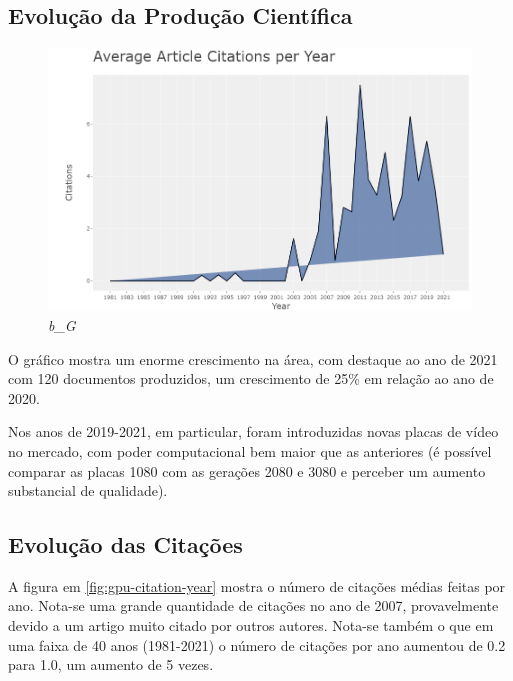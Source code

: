 \subsection{Evolução da Produção Científica}



\begin{figure}[ht]
    \centering
    \includegraphics[width=12cm]{experiments/gustavo-tomas/AnaliseBibliometrica/GPUs/Graficos/gpu-citation-year.png}
    \caption{\textit{b\_G}}
    \label{fig:}
\end{figure}

O gráfico mostra um enorme crescimento na área, com destaque ao ano de 2021 com 120 documentos produzidos, um crescimento de 25\% em relação ao ano de 2020.

Nos anos de 2019-2021, em particular, foram introduzidas novas placas de vídeo no mercado, com poder computacional bem maior que as anteriores (é possível comparar as placas 1080 com as gerações 2080 e 3080 e perceber um aumento substancial de qualidade).

\subsection{Evolução das Citações}

A figura em \ref{fig:gpu-citation-year} mostra o número de citações médias feitas por ano. Nota-se uma grande quantidade de citações no ano de 2007, provavelmente devido a um artigo muito citado por outros autores. Nota-se também o que em uma faixa de 40 anos (1981-2021) o número de citações por ano aumentou de 0.2 para 1.0, um aumento de 5 vezes.

